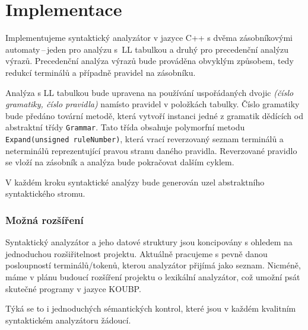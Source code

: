 \documentclass[a4paper]{article}
\begin{document}
\section*{Implementace}
Implementujeme syntaktický analyzátor v jazyce C++ s dvěma zásobníkovými automaty\,--\,jeden pro analýzu s~LL tabulkou a druhý pro precedenční analýzu výrazů.
Precedenční analýza výrazů bude prováděna obvyklým způsobem, tedy redukcí terminálů a případně pravidel na zásobníku.

Analýza s LL tabulkou bude upravena na používání uspořádaných dvojic \emph{(číslo gramatiky, číslo pravidla)} namísto pravidel v položkách tabulky.
Číslo gramatiky bude předáno tovární metodě, která vytvoří instanci jedné z gramatik dědících od abstraktní třídy \texttt{Grammar}.
Tato třída obsahuje polymorfní metodu \texttt{Expand(unsigned ruleNumber)}, která vrací reverzovaný seznam terminálů a neterminálů reprezentující pravou stranu daného pravidla.
Reverzované pravidlo se vloží na zásobník a analýza bude pokračovat dalším cyklem.

V každém kroku syntaktické analýzy bude generován uzel abstraktního syntaktického stromu.

\subsubsection*{Možná rozšíření}
Syntaktický analyzátor a jeho datové struktury jsou koncipovány s ohledem na jednoduchou rozšiřitelnost projektu.
Aktuálně pracujeme s pevně danou posloupností terminálů/tokenů, kterou analyzátor přijímá jako seznam.
Nicméně, máme v plánu budoucí rozšíření projektu o lexikální analyzátor, což umožní psát skutečné programy v jazyce KOUBP.

Týká se to i jednoduchých sémantických kontrol, které jsou v každém kvalitním syntaktickém analyzátoru žádoucí.
\end{document}
